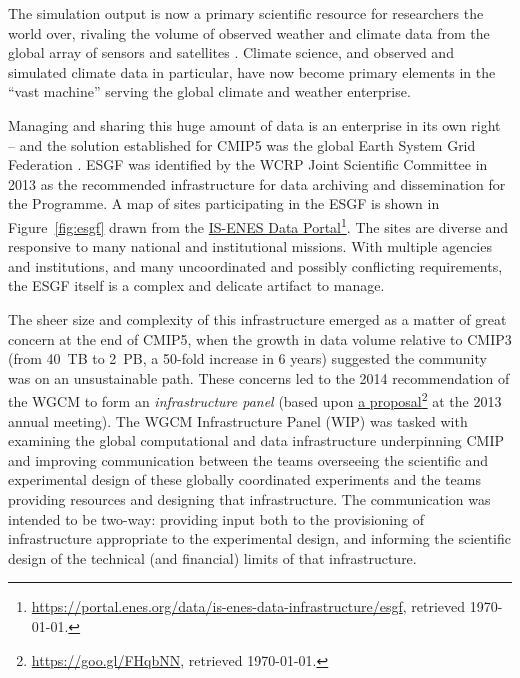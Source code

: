 \documentclass[gmd,manuscript]{copernicus}
\newcommand{\urlref}[2] {\href{#1}{#2}\footnote{\url{#1}, retrieved \today.}}
\begin{document}
The simulation output is now a primary scientific resource for
researchers the world over, rivaling the volume of observed weather
and climate data from the global array of sensors and satellites
\citep{ref:overpecketal2011}. Climate science, and observed and simulated
climate data in particular, have now become primary elements in the
``vast machine'' \citep{ref:edwards2010} serving the global climate and
weather enterprise.

Managing and sharing this huge amount of data is an enterprise in its
own right -- and the solution established for CMIP5 was the global
Earth System Grid Federation
\citep[ESGF,][]{ref:williamsetal2011a,ref:williamsetal2015}. ESGF was
identified by the WCRP Joint Scientific Committee in 2013 as the
recommended infrastructure for data archiving and dissemination for
the Programme.
A map of sites participating in the ESGF is shown in
Figure~\ref{fig:esgf} drawn from the
\urlref{https://portal.enes.org/data/is-enes-data-infrastructure/esgf}{IS-ENES
  Data Portal}. The sites are diverse and responsive to many national
and institutional missions. With multiple agencies and institutions,
and many uncoordinated and possibly conflicting requirements, the ESGF
itself is a complex and delicate
artifact to manage.

\begin{figure*}
  \begin{center}
  \end{center}
  \caption{Sites participating in the Earth System Grid Federation in
    May 2017. Figure courtesy IS-ENES Data Portal. }
  \label{fig:esgf}
\end{figure*}

The sheer size and complexity of this infrastructure emerged as a
matter of great concern at the end of CMIP5, when the growth in data
volume relative to CMIP3 (from 40~TB to 2~PB, a 50-fold increase in 6
years) suggested the community was on an unsustainable path. These
concerns led to the 2014 recommendation of the WGCM to form an
\emph{infrastructure panel} (based upon
\urlref{https://goo.gl/FHqbNN}{a proposal} at the 2013 annual
meeting). The WGCM Infrastructure Panel (WIP) was tasked with
examining the global computational and data infrastructure
underpinning CMIP and improving communication between the teams
overseeing the scientific and experimental design of these globally
coordinated experiments and the teams providing resources and
designing that infrastructure. The communication was intended to be
two-way: providing input both to the provisioning of infrastructure
appropriate to the experimental design, and informing the scientific
design of the technical (and financial) limits of that infrastructure.
\end{document}
